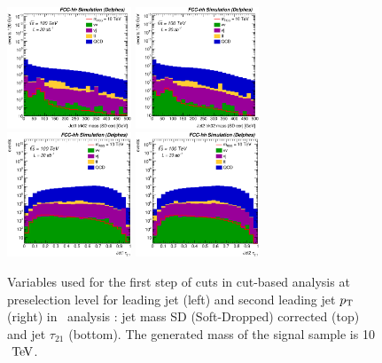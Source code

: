 \begin{figure}[!htb]\centering
\includegraphics[width=0.33\textwidth]{Fig/RSGww/Jet1_trk02_SD_Cor_m_sel0_nostack_log.eps}
\includegraphics[width=0.33\textwidth]{Fig/RSGww/Jet2_trk02_SD_Cor_m_sel0_nostack_log.eps}
\includegraphics[width=0.33\textwidth]{Fig/RSGww/Jet1_tau21_sel0_nostack_log.eps}
\includegraphics[width=0.33\textwidth]{Fig/RSGww/Jet2_tau21_sel0_nostack_log.eps}
\caption{Variables used for the first step of cuts in cut-based analysis at preselection level for leading jet (left) and second leading jet $p\sb{\scriptstyle\mathrm{T}}$ (right) in \rsg\ analysis : jet mass SD (Soft-Dropped) corrected (top) and jet $\tau_{21}$ (bottom). The generated mass of the signal sample is 10 $\TeV$.}
\label{fig:RSGww_sel0_cut}
\end{figure}


